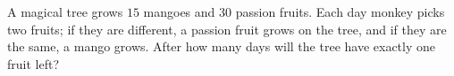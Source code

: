 A magical tree grows $15$ mangoes and $30$ passion fruits. Each day monkey picks two fruits; if they are different, a passion fruit grows on the tree, and if they are the same, a mango grows. After how many days will the tree have exactly one fruit left?
